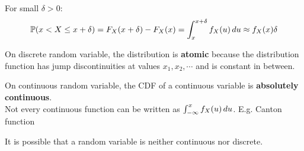 \documentclass{huhtakm-template-book}
\newcommand{\prob}{\mathbb{P}}
\begin{document}
\begin{rem}
	For small $\delta>0$:
	\begin{equation*}
		\prob(x<X\leq x+\delta)=F_{X}(x+\delta)-F_{X}(x)=\intlu{x}{x+\delta}f_{X}(u)\,du\approx f_{X}(x)\delta
	\end{equation*}
\end{rem}
\begin{rem}
	On discrete random variable, the distribution is \textbf{atomic} because the distribution function has jump discontinuities at values $x_{1},x_{2},\cdots$ and is constant in between.
\end{rem}
\begin{rem}
	On continuous random variable, the CDF of a continuous variable is \textbf{absolutely continuous}.\\
	Not every continuous function can be written as $\int_{-\infty}^{x}f_{X}(u)\,du$. E.g. Canton function
\end{rem}
\begin{rem}
	It is possible that a random variable is neither continuous nor discrete.
\end{rem}
\end{document}
